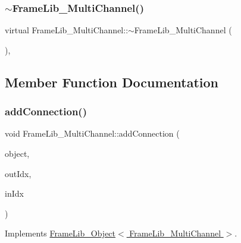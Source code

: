 \subsubsection{\texorpdfstring{$\sim$\+Frame\+Lib\+\_\+\+Multi\+Channel()}{~FrameLib\_MultiChannel()}}
{\footnotesize\ttfamily virtual Frame\+Lib\+\_\+\+Multi\+Channel\+::$\sim$\+Frame\+Lib\+\_\+\+Multi\+Channel (\begin{DoxyParamCaption}{ }\end{DoxyParamCaption})\hspace{0.3cm}{\ttfamily [inline]}, {\ttfamily [virtual]}}



\subsection{Member Function Documentation}
\mbox{\label{class_frame_lib___multi_channel_ab610f5adf0eb5b287a4a81806ce9b528}} 
\subsubsection{\texorpdfstring{add\+Connection()}{addConnection()}}
{\footnotesize\ttfamily void Frame\+Lib\+\_\+\+Multi\+Channel\+::add\+Connection (\begin{DoxyParamCaption}\item[{\hyperlink{class_frame_lib___multi_channel}{Frame\+Lib\+\_\+\+Multi\+Channel} $\ast$}]{object,  }\item[{unsigned long}]{out\+Idx,  }\item[{unsigned long}]{in\+Idx }\end{DoxyParamCaption})\hspace{0.3cm}{\ttfamily [virtual]}}



Implements \hyperlink{class_frame_lib___object_ab276c500466359bb43494ff2b7c94cc6}{Frame\+Lib\+\_\+\+Object$<$ Frame\+Lib\+\_\+\+Multi\+Channel $>$}.

\mbox{\label{class_frame_lib___multi_channel_a8ad8f1c0138f32ef0bfb7e4673b34d30}} 
